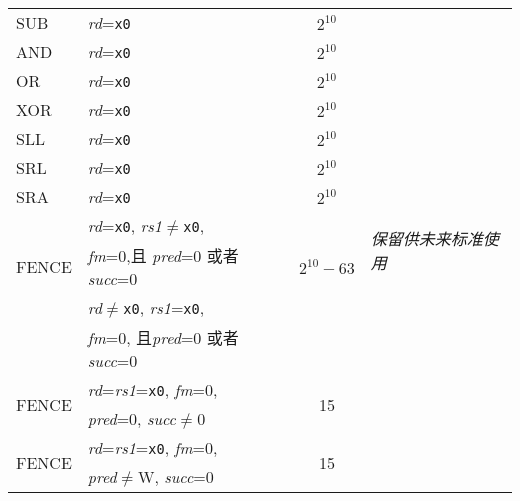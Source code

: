 \begin{table}[hbt]
\begin{tabular}{|l|l|c|l|}
  SUB                   & {\em rd}={\tt x0}                           & $2^{10}$                    & \multirow{17}{*}{\em 保留供未来标准使用} \\ \cline{1-3}
  AND                   & {\em rd}={\tt x0}                           & $2^{10}$                    & \\ \cline{1-3}
  OR                    & {\em rd}={\tt x0}                           & $2^{10}$                    & \\ \cline{1-3}
  XOR                   & {\em rd}={\tt x0}                           & $2^{10}$                    & \\ \cline{1-3}
  SLL                   & {\em rd}={\tt x0}                           & $2^{10}$                    & \\ \cline{1-3}
  SRL                   & {\em rd}={\tt x0}                           & $2^{10}$                    & \\ \cline{1-3}
  SRA                   & {\em rd}={\tt x0}                           & $2^{10}$                    & \\ \cline{1-3}
  \multirow{3}{*}{FENCE}& {\em rd}={\tt x0}, {\em rs1}$\neq${\tt x0}, & \multirow{3}{*}{$2^{10}-63$}& \\
                        & {\em fm}=0,且 {\em pred}=0 或者 {\em succ}=0                 &                             & \\ \cline{1-3} 
  \multirow{3}{*}{FENCE}& {\em rd}$\neq${\tt x0}, {\em rs1}={\tt x0}, & \multirow{3}{*}{$2^{10}-63$}& \\
                        & {\em fm}=0, 且{\em pred}=0 或者 {\em succ}=0            &                             & \\ \cline{1-3}
  \multirow{2}{*}{FENCE}& {\em rd}={\em rs1}={\tt x0}, {\em fm}=0,    & \multirow{2}{*}{15}         & \\
                        & {\em pred}=0, {\em succ}$\neq$0             &                             & \\ \cline{1-3}
  \multirow{2}{*}{FENCE}& {\em rd}={\em rs1}={\tt x0}, {\em fm}=0,    & \multirow{2}{*}{15}         & \\
                        & {\em pred}$\neq$W, {\em succ}=0             &                             & \\ \hline

\end{tabular}
\end{table}
